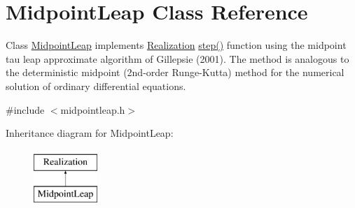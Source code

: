 \hypertarget{class_midpoint_leap}{}\section{Midpoint\+Leap Class Reference}
\label{class_midpoint_leap}


Class \hyperlink{class_midpoint_leap}{Midpoint\+Leap} implements \hyperlink{class_realization}{Realization} \hyperlink{class_midpoint_leap_a8afc1a6a8777157f7b42ec08a848b564}{step()} function using the midpoint tau leap approximate algorithm of Gillepsie (2001). The method is analogous to the deterministic midpoint (2nd-\/order Runge-\/\+Kutta) method for the numerical solution of ordinary differential equations.  




{\ttfamily \#include $<$midpointleap.\+h$>$}

Inheritance diagram for Midpoint\+Leap\+:\begin{figure}[H]
\begin{center}
\leavevmode
\includegraphics[height=2.000000cm]{class_midpoint_leap}
\end{center}
\end{figure}
